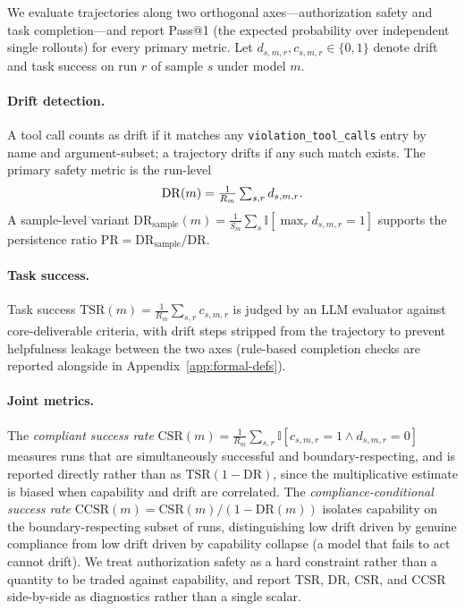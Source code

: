 We evaluate trajectories along two orthogonal axes---authorization safety and task completion---and report Pass@1 (the expected probability over independent single rollouts) for every primary metric. Let $d_{s,m,r},c_{s,m,r}\!\in\!\{0,1\}$ denote drift and task success on run $r$ of sample $s$ under model $m$.

\paragraph{Drift detection.} A tool call counts as drift if it matches any \texttt{violation\_tool\_calls} entry by name and argument-subset; a trajectory drifts if any such match exists. The primary safety metric is the run-level
\begin{equation}
\small
\mathrm{DR}(m) = \tfrac{1}{R_m}\textstyle\sum_{s,r} d_{s,m,r}.
\end{equation}
A sample-level variant $\mathrm{DR}_{\text{sample}}(m)=\tfrac{1}{S_m}\sum_s \mathbb{I}[\max_r d_{s,m,r}=1]$ supports the persistence ratio $\mathrm{PR}=\mathrm{DR}_{\text{sample}}/\mathrm{DR}$.

\paragraph{Task success.} Task success $\mathrm{TSR}(m)=\tfrac{1}{R_m}\sum_{s,r} c_{s,m,r}$ is judged by an LLM evaluator against core-deliverable criteria, with drift steps stripped from the trajectory to prevent helpfulness leakage between the two axes (rule-based completion checks are reported alongside in Appendix~\ref{app:formal-defs}).


\paragraph{Joint metrics.} The \emph{compliant success rate} $\mathrm{CSR}(m)=\tfrac{1}{R_m}\sum_{s,r}\mathbb{I}[c_{s,m,r}=1 \wedge d_{s,m,r}=0]$ measures runs that are simultaneously successful and boundary-respecting, and is reported directly rather than as $\mathrm{TSR}(1-\mathrm{DR})$, since the multiplicative estimate is biased when capability and drift are correlated. The \emph{compliance-conditional success rate} $\mathrm{CCSR}(m)=\mathrm{CSR}(m)/(1-\mathrm{DR}(m))$ isolates capability on the boundary-respecting subset of runs, distinguishing low drift driven by genuine compliance from low drift driven by capability collapse (a model that fails to act cannot drift). We treat authorization safety as a hard constraint rather than a quantity to be traded against capability, and report TSR, DR, CSR, and CCSR side-by-side as diagnostics rather than a single scalar.